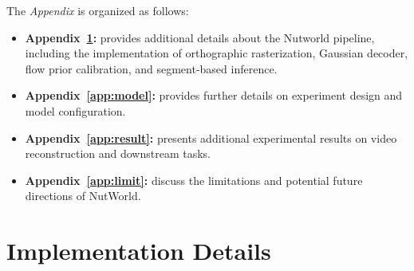 \clearpage

\maketitlesupplementary
\setcounter{page}{1}
\setcounter{section}{0}


\noindent The \textit{Appendix} is organized as follows:
\begin{itemize}[leftmargin=*]
    \item \textbf{Appendix~\ref{app:imp}:} provides additional details about the Nutworld pipeline, including the implementation of orthographic rasterization, Gaussian decoder, flow prior calibration, and segment-based inference.
    
    \item \textbf{Appendix~\ref{app:model}:} provides further details on experiment design and model configuration.
    

    \item \textbf{Appendix~\ref{app:result}:} presents additional experimental results on video reconstruction and downstream tasks.

        \item \textbf{Appendix~\ref{app:limit}:} discuss the limitations and potential future directions of NutWorld.

\end{itemize}


\section{Implementation Details}
\label{app:imp}

